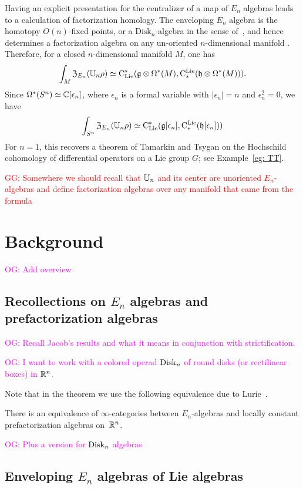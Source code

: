 \documentclass[11pt]{amsart}
\numberwithin{equation}{section}
\def\owen{\textcolor{magenta}{OG: }\textcolor{magenta}}
\def\greg{\textcolor{red}{GG: }\textcolor{red}}
\begin{document}
Having an explicit presentation for the centralizer of a map of $E_n$ algebras leads to a calculation of factorization homology.
The enveloping $E_n$ algebra is the homotopy $O(n)$-fixed points, or a $\mathrm{Disk}_n$-algebra in the sense of~\cite{AF},
and hence determines a factorization algebra on any un-oriented $n$-dimensional manifold \cite{Knudsen}.
Therefore, for a closed $n$-dimensional manifold $M$, one has
\[
\int_M {\frak Z}_{E_n}(\mathbb U_n \rho) \simeq {\rm C}_{\rm Lie}^*(\mathfrak g \otimes \Omega^*(M), {\rm C}^{\rm Lie}_*( \mathfrak h \otimes \Omega^*(M))).
\]
Since $\Omega^*(S^n) \simeq \mathbb C[\epsilon_n]$, where $\epsilon_n$ is a formal variable with $|\epsilon_n| = n$ and $\epsilon_n^2 = 0$, we have
\[
\int_{S^n} {\frak Z}_{E_n}(\mathbb U_n \rho) \simeq {\rm C}_{\rm Lie}^*(\mathfrak g[\epsilon_n], {\rm C}^{\rm Lie}_*( \mathfrak h[\epsilon_n]))
\]
For $n=1$, this recovers a theorem of Tamarkin and Tsygan \cite{TT} on the Hochschild cohomology of differential operators on a Lie group $G$;
see Example~\ref{eg: TT}. 

\greg{Somewhere we should recall that $\mathbb U_n$ and its center are unoriented $E_n$-algebras and define factorization algebras over any manifold that came from the formula}

\section{Background}

\owen{Add overview}

\subsection{Recollections on $E_n$ algebras and prefactorization algebras}
\label{sec: en background}

\owen{Recall Jacob's results and what it means in conjunction with strictification.}

\owen{I want to work with a colored operad ${\rm Disk}_n$ of round disks (or rectilinear boxes) in $\mathbb R^n$.}

Note that in the theorem we use the following equivalence due to Lurie~\cite{LurieHA}. 

\begin{thm}
\label{T:En=Fac} 
There is an equivalence of $\infty$-categories between $E_n$-algebras and locally constant prefactorization algebras on~$\mathbb R^n$. 
\end{thm}

\owen{Plus a version for ${\rm Disk}_n$ algebras}

\subsection{Enveloping $E_n$ algebras of Lie algebras}
\label{sec: enveloping}
\end{document}
